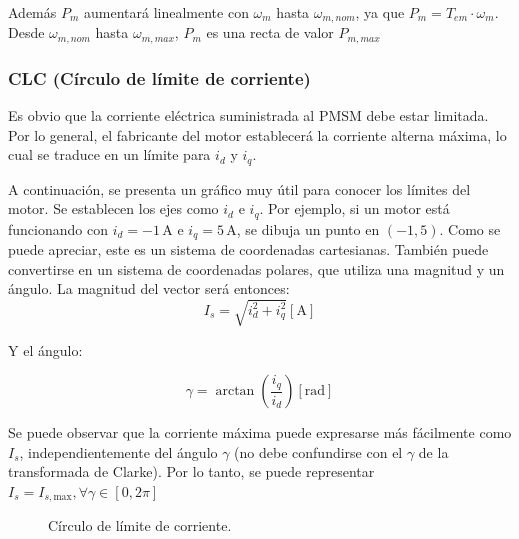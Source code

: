 Además \(P_m\) aumentará linealmente con \(\omega_m\) hasta \(\omega_{m,nom}\), ya que \(P_m = T_{em} \cdot \omega_m\). Desde \(\omega_{m,nom}\) hasta \(\omega_{m,max}\), \(P_m\) es una recta de valor \(P_{m,max}\)

\subsubsection{CLC (Círculo de límite de corriente)}

Es obvio que la corriente eléctrica suministrada al PMSM debe estar limitada. Por lo general, el fabricante del motor establecerá la corriente alterna máxima, lo cual se traduce en un límite para \(i_d\) y \(i_q\).

A continuación, se presenta un gráfico muy útil para conocer los límites del motor. Se establecen los ejes como $i_d$ e $i_q$. Por ejemplo, si un motor está funcionando con $i_d = -1 \, \text{A}$ e $i_q = 5 \, \text{A}$, se dibuja un punto en $(-1,5)$. Como se puede apreciar, este es un sistema de coordenadas cartesianas. También puede convertirse en un sistema de coordenadas polares, que utiliza una magnitud y un ángulo. La magnitud del vector será entonces:
\begin{equation}
I_{s} = \sqrt{i_d^2+i_q^2} [\text{A}]
\end{equation}

Y el ángulo:

\begin{equation}
\gamma = \arctan\left(\frac{i_q}{i_d}\right) [\text{rad}]
\end{equation}

Se puede observar que la corriente máxima puede expresarse más fácilmente como $I_s$, independientemente del ángulo $\gamma$ (no debe confundirse con el $\gamma$ de la transformada de Clarke). Por lo tanto, se puede representar $I_s = I_{s,\text{max}} , \forall \gamma \in [0,2\pi]$

\begin{figure}[H]
	\centering
  \caption{Círculo de límite de corriente.}
\end{figure}


